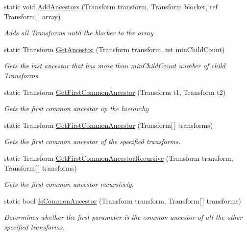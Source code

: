 \begin{DoxyCompactItemize}
static void \mbox{\hyperlink{class_root_motion_1_1_hierarchy_a77f26ed493417b1df026c76447557cd7}{Add\+Ancestors}} (Transform transform, Transform blocker, ref Transform\mbox{[}$\,$\mbox{]} array)
\begin{DoxyCompactList}\small\item\em Adds all Transforms until the blocker to the array \end{DoxyCompactList}\item 
static Transform \mbox{\hyperlink{class_root_motion_1_1_hierarchy_a2ef812253318215efaed1be5453f2f25}{Get\+Ancestor}} (Transform transform, int min\+Child\+Count)
\begin{DoxyCompactList}\small\item\em Gets the last ancestor that has more than min\+Child\+Count number of child Transforms \end{DoxyCompactList}\item 
static Transform \mbox{\hyperlink{class_root_motion_1_1_hierarchy_aa929c256d633e081ba43e7cae79dde38}{Get\+First\+Common\+Ancestor}} (Transform t1, Transform t2)
\begin{DoxyCompactList}\small\item\em Gets the first common ancestor up the hierarchy \end{DoxyCompactList}\item 
static Transform \mbox{\hyperlink{class_root_motion_1_1_hierarchy_a31df37f173becc59e1fc080d52aa412e}{Get\+First\+Common\+Ancestor}} (Transform\mbox{[}$\,$\mbox{]} transforms)
\begin{DoxyCompactList}\small\item\em Gets the first common ancestor of the specified transforms. \end{DoxyCompactList}\item 
static Transform \mbox{\hyperlink{class_root_motion_1_1_hierarchy_a3c9473033f81042f0e9676b68c2f341e}{Get\+First\+Common\+Ancestor\+Recursive}} (Transform transform, Transform\mbox{[}$\,$\mbox{]} transforms)
\begin{DoxyCompactList}\small\item\em Gets the first common ancestor recursively. \end{DoxyCompactList}\item 
static bool \mbox{\hyperlink{class_root_motion_1_1_hierarchy_af09d1c35c2a5c12aa3704f9e5403b355}{Is\+Common\+Ancestor}} (Transform transform, Transform\mbox{[}$\,$\mbox{]} transforms)
\begin{DoxyCompactList}\small\item\em Determines whether the first parameter is the common ancestor of all the other specified transforms. \end{DoxyCompactList}\end{DoxyCompactItemize}


